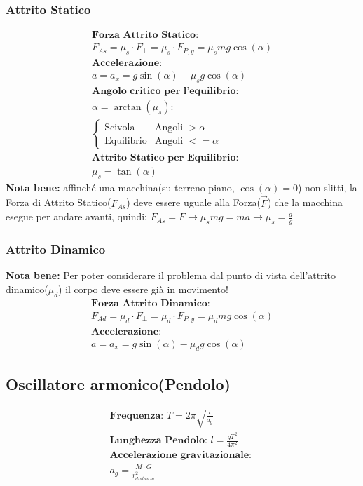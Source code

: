 \subsubsection{Attrito Statico}
\begin{gather*}
    \textbf{Forza Attrito Statico: } \\ F_{As} = \mu_s \cdot F_\perp = \mu_s \cdot F_{P, y} = \mu_s m g \cos (\alpha) \\
    \textbf{Accelerazione: } \\ a = a_x = g \sin (\alpha) - \mu_s g \cos (\alpha) \\
    \textbf{Angolo critico per l'equilibrio: } \\ \alpha = \arctan (\mu_s) : \\
    \begin{cases}
        \text{Scivola} & \text{Angoli } > \alpha \\
        \text{Equilibrio} & \text{Angoli } <= \alpha
    \end{cases}    \\
    \textbf{Attrito Statico per Equilibrio: } \\ \mu_s = \tan (\alpha)
\end{gather*}
\textbf{Nota bene: } affinché una macchina(su terreno piano, $\cos (\alpha) = 0$) non slitti, la Forza di Attrito Statico($F_{As}$) deve essere uguale alla Forza($\vec{F}$) che la macchina esegue per andare avanti, quindi: $F_{As} = F \rightarrow \mu_s m g = m a \rightarrow \mu_s = \frac{a}{g}$
\subsubsection{Attrito Dinamico}
\textbf{Nota bene: } Per poter considerare il problema dal punto di vista dell'attrito dinamico($\mu_d$) il corpo deve essere già in movimento!
\begin{gather*}
    \textbf{Forza Attrito Dinamico:} \\ F_{Ad} = \mu_d \cdot F_\perp = \mu_d \cdot F_{P, y} = \mu_d m g \cos (\alpha) \\
    \textbf{Accelerazione: } \\ a = a_x = g \sin (\alpha) - \mu_d g \cos (\alpha)
\end{gather*}






\subsection{Oscillatore armonico(Pendolo)}
\begin{gather*}
    \textbf{Frequenza: } T = 2 \pi \sqrt{\frac{l}{a_g}} \\
    \textbf{Lunghezza Pendolo: } l = \frac{g T^2}{4 \pi^2} \\
    \textbf{Accelerazione gravitazionale: } \\ a_g = \frac{M \cdot G}{r_{distanza}^2}
\end{gather*}
